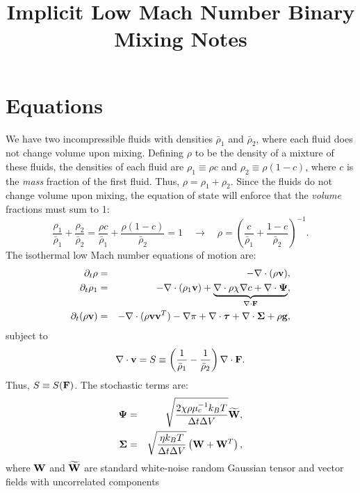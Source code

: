 \documentclass[final]{siamltex}
\def\Fb {{\bf F}}
\def\gb {{\bf g}}
\def\vb {{\bf v}}
\def\Wb {{\bf W}}
\def\Psib {\boldsymbol{\Psi}}
\def\taub {\boldsymbol{\tau}}
\def\Sigmab {\boldsymbol{\Sigma}}
\begin{document}
\title{Implicit Low Mach Number Binary Mixing Notes}

\maketitle

\section{Equations}
We have two incompressible fluids with densities $\bar\rho_1$ and $\bar\rho_2$, where 
each fluid does not change volume upon mixing.  Defining $\rho$ to be the density of
a mixture of these fluids, the densities of each fluid are $\rho_1 \equiv \rho c$ and 
$\rho_2 \equiv \rho(1-c)$, where $c$ is the {\it mass} fraction of the first fluid.  
Thus, $\rho = \rho_1 + \rho_2$.  Since the fluids do not change volume upon mixing, 
the equation of state will enforce that the {\it volume} fractions must sum to 1:
\begin{equation}
\frac{\rho_1}{\bar\rho_1} + \frac{\rho_2}{\bar\rho_2} =
\frac{\rho c}{\bar\rho_1} + \frac{\rho(1-c)}{\bar\rho_2} = 1 
\quad \rightarrow \quad
\rho = \left(\frac{c}{\bar\rho_1} + \frac{1-c}{\bar\rho_2}\right)^{-1}.
\end{equation}
The isothermal low Mach number equations of motion are:
\begin{eqnarray}
\partial_t\rho &=& -\nabla\cdot(\rho\vb),\\
\partial_t\rho_1 &=& -\nabla\cdot(\rho_1\vb) + \underbrace{\nabla\cdot\rho\chi\nabla c + \nabla\cdot\Psib}_{\nabla\cdot\Fb},\\
\partial_t(\rho\vb) &=& -\nabla\cdot(\rho\vb\vb^T) - \nabla\pi + \nabla\cdot\taub + \nabla\cdot\Sigmab + \rho\gb,
\end{eqnarray}
subject to
\begin{equation}
\nabla\cdot\vb = S \equiv \left(\frac{1}{\bar\rho_1}-\frac{1}{\bar\rho_2}\right)\nabla\cdot\Fb.
\end{equation}
Thus, $S \equiv S(\Fb)$.  The stochastic terms are:
\begin{eqnarray}
\Psib &=& \sqrt{\frac{2\chi\rho\mu_c^{-1}k_BT}{\Delta t\Delta V}}\widetilde\Wb,\\
\Sigmab &=& \sqrt{\frac{\eta k_B T}{\Delta t\Delta V}}\left(\Wb + \Wb^T\right),
\end{eqnarray}
where $\Wb$ and $\widetilde\Wb$ are standard white-noise random Gaussian tensor
and vector fields with uncorrelated components
\end{document}
